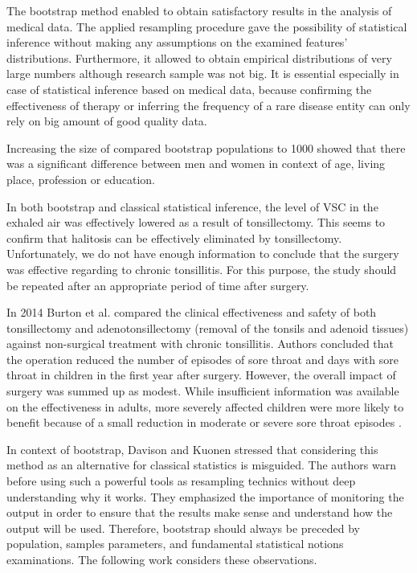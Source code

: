 \documentclass[12pt,a4paper,notitlepage]{report}
\begin{document}
The bootstrap method enabled to obtain satisfactory results in the analysis of medical data. The applied resampling procedure gave the possibility of statistical inference without making any assumptions on the examined features' distributions. Furthermore, it allowed to obtain empirical distributions of very large numbers although research sample was not big. It is essential especially in case of statistical inference based on medical data, because confirming the effectiveness of therapy or inferring the frequency of a rare disease entity can only rely on big amount of good quality data.

Increasing the size of compared bootstrap populations to 1000 showed that there was a significant difference between men and women in context of age, living place, profession or education. 

In both bootstrap and classical statistical inference, the level of VSC in the exhaled air was effectively lowered as a result of tonsillectomy. This seems to confirm that halitosis can be effectively eliminated by tonsillectomy. Unfortunately, we do not have enough information to conclude that the surgery was effective regarding to chronic tonsillitis. For this purpose, the study should be repeated after an appropriate period of time after surgery.

In 2014 Burton et al. compared the clinical effectiveness and safety of both tonsillectomy and adenotonsillectomy (removal of the tonsils and adenoid tissues) against non-surgical treatment with chronic tonsillitis. Authors concluded that the operation reduced the number of episodes of sore throat and days with sore throat in children in the first year after surgery. However, the overall impact of surgery was summed up as modest. While insufficient information was available on the effectiveness in adults, more severely affected children were more likely to benefit because of a small reduction in moderate or severe sore throat episodes \cite{Burton14}.

In context of bootstrap, Davison and Kuonen \cite{Davison03} stressed that considering this method as an alternative for classical statistics is misguided. The authors warn before using such a powerful tools as resampling technics without deep understanding why it works. They emphasized the importance of monitoring the output in order to ensure that the results make sense and understand how the output will be used. Therefore, bootstrap should always be preceded by population, samples parameters, and fundamental statistical notions examinations. The following work considers these observations.
\end{document}
